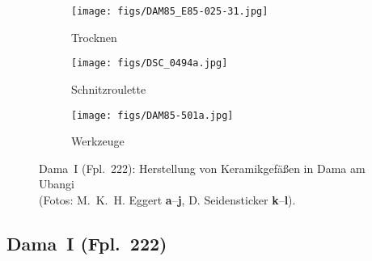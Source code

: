 \begin{figure*}[p]
\begin{subfigure}[t]{0.32\textwidth}
		\centering
		\texttt{[image: figs/DAM85\_E85-025-31.jpg]}
		\caption{Trocknen}
		\label{fig:DAM85_Töpferei_j}
	\end{subfigure}
	\begin{subfigure}[t]{0.32\textwidth}
		\centering
		\texttt{[image: figs/DSC\_0494a.jpg]}
		\caption{Schnitzroulette}
		\label{fig:DAM85_Töpferei_k}
	\end{subfigure}
	\begin{subfigure}[t]{0.32\textwidth}
		\centering
		\texttt{[image: figs/DAM85-501a.jpg]}
		\caption{Werkzeuge}
		\label{fig:DAM85_Töpferei_l}
	\end{subfigure}
	\caption{Dama~I (Fpl.~222): Herstellung von Keramikgefäßen in Dama am Ubangi\\(Fotos: M.~K.~H. Eggert \textbf{a}--\textbf{j}, D. Seidensticker \textbf{k}--\textbf{l}).}
	\label{fig:DAM85_Töpferei}
\end{figure*}

\subsection*{Dama~I (Fpl.~222)}\label{sec:DAM_Herstellung}

